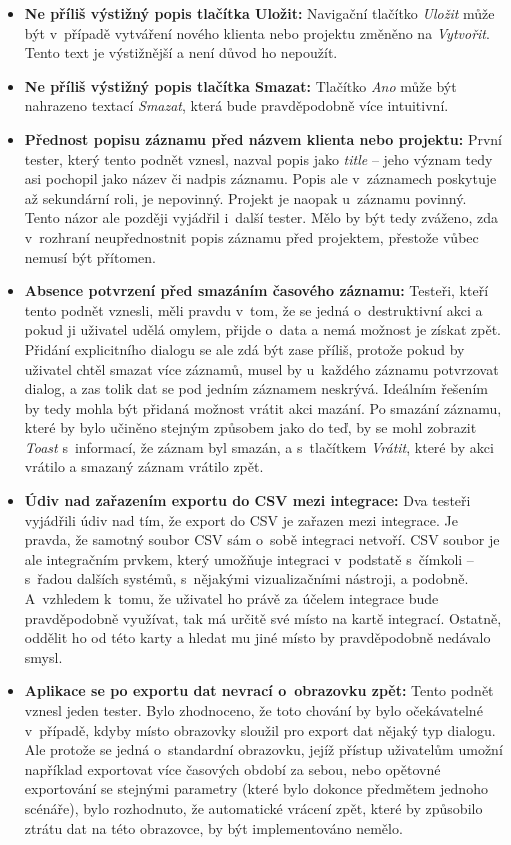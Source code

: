 \begin{itemize}
\item\textbf{Ne příliš výstižný popis tlačítka Uložit:} Navigační tlačítko \emph{Uložit} může být v~případě vytváření nového klienta nebo projektu změněno na \emph{Vytvořit}. Tento text je výstižnější a není důvod ho nepoužít.
\item\textbf{Ne příliš výstižný popis tlačítka Smazat:} Tlačítko \emph{Ano} může být nahrazeno textací \emph{Smazat}, která bude pravděpodobně více intuitivní.
\item\textbf{Přednost popisu záznamu před názvem klienta nebo projektu:} První tester, který tento podnět vznesl, nazval popis jako \emph{title} – jeho význam tedy asi pochopil jako název či nadpis záznamu. Popis ale v~záznamech poskytuje až sekundární roli, je nepovinný. Projekt je naopak u~záznamu povinný. Tento názor ale později vyjádřil i~další tester. Mělo by být tedy zváženo, zda v~rozhraní neupřednostnit popis záznamu před projektem, přestože vůbec nemusí být přítomen.
\item\textbf{Absence potvrzení před smazáním časového záznamu:} Testeři, kteří tento podnět vznesli, měli pravdu v~tom, že se jedná o~destruktivní akci a pokud ji uživatel udělá omylem, přijde o~data a nemá možnost je získat zpět. Přidání explicitního dialogu se ale zdá být zase příliš, protože pokud by uživatel chtěl smazat více záznamů, musel by u~každého záznamu potvrzovat dialog, a zas tolik dat se pod jedním záznamem neskrývá. Ideálním řešením by tedy mohla být přidaná možnost vrátit akci mazání. Po smazání záznamu, které by bylo učiněno stejným způsobem jako do teď, by se mohl zobrazit \emph{Toast} s~informací, že záznam byl smazán, a s~tlačítkem \emph{Vrátit}, které by akci vrátilo a smazaný záznam vrátilo zpět.
\item\textbf{Údiv nad zařazením exportu do CSV mezi integrace:} Dva testeři vyjádřili údiv nad tím, že export do CSV je zařazen mezi integrace. Je pravda, že samotný soubor CSV sám o~sobě integraci netvoří. CSV soubor je ale integračním prvkem, který umožňuje integraci v~podstatě s~čímkoli – s~řadou dalších systémů, s~nějakými vizualizačními nástroji, a podobně. A~vzhledem k~tomu, že uživatel ho právě za účelem integrace bude pravděpodobně využívat, tak má určitě své místo na kartě integrací. Ostatně, oddělit ho od této karty a hledat mu jiné místo by pravděpodobně nedávalo smysl.
\item\textbf{Aplikace se po exportu dat nevrací o~obrazovku zpět:} Tento podnět vznesl jeden tester. Bylo zhodnoceno, že toto chování by bylo očekávatelné v~případě, kdyby místo obrazovky sloužil pro export dat nějaký typ dialogu. Ale protože se jedná o~standardní obrazovku, jejíž přístup uživatelům umožní například exportovat více časových období za sebou, nebo opětovné exportování se stejnými parametry (které bylo dokonce předmětem jednoho scénáře), bylo rozhodnuto, že automatické vrácení zpět, které by způsobilo ztrátu dat na této obrazovce, by být implementováno nemělo.

\end{itemize}
